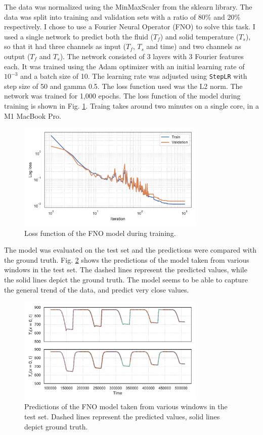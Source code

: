 \documentclass[unicode,11pt,a4paper,oneside,numbers=endperiod,openany]{scrartcl}
\begin{document}
The data was normalized using the MinMaxScaler from the sklearn library.
The data was split into training and validation sets with a
ratio of 80\% and 20\% respectively.
I chose to use a Fourier Neural Operator (FNO) to solve this task. I used a
single network to predict both the fluid ($T_f$) and solid temperature ($T_s$),
so that it had three
channels as input ($T_f$, $T_s$ and time) and two channels as output ($T_f$ and
$T_s$). 
The network
consisted of 3 layers with 3 Fourier features each.
It was trained using the Adam optimizer with an initial learning rate
of $10^{-3}$ and a batch size of 10. 
The learning rate was adjusted using \texttt{StepLR} with step size of 50 and gamma 0.5.
The loss function used was the L2 norm. 
The network was trained for 1,000 epochs.
The loss function of the model during training is shown in Fig. \ref{fig:loss}.
Traing takes around two minutes on a single core, in a M1 MacBook Pro.
\begin{figure}[ht!]
    \centering
    \includegraphics[width=0.8\textwidth]{../task1/fno/loss_function.pdf}
    \caption{Loss function of the FNO model during training.}
    \label{fig:loss}
\end{figure}

The model was evaluated on the test set and the predictions were compared with
the ground truth. Fig. \ref{fig:predictions} shows the predictions of the model
taken from various windows in the test set. The dashed lines represent the
predicted values, while the solid lines depict the ground truth.
The model seems to be able to capture the general trend of the data, and predict
very close values.
\begin{figure}[ht!]
    \centering
    \includegraphics[width=0.8\textwidth]{../task1/fno/plot_predictions.pdf}
    \caption{Predictions of the FNO model taken from various windows in the test set. Dashed lines represent the predicted values, solid lines depict ground truth.}
    \label{fig:predictions}
\end{figure}
\end{document}
